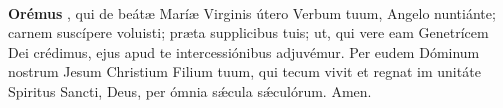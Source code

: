 \\[2mm]
\textbf{Orémus}
, qui de beát{\ae} Marí{\ae} Virginis útero Verbum tuum, Angelo nuntiánte; carnem suscípere voluisti; pr{\ae}ta supplicibus tuis; ut, qui vere eam Genetrícem
Dei crédimus, ejus apud te intercessiónibus adjuvémur. Per eudem Dóminum nostrum Jesum Christium Filium tuum, qui tecum vivit et regnat im unitáte Spiritus Sancti, Deus, per ómnia
s{\'\ae}cula s{\'\ae}culórum. Amen.